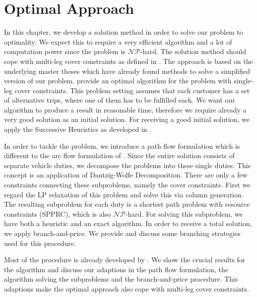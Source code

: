 \chapter{Optimal Approach}
\label{ch:optimal_approach}

In this chapter, we develop a solution method in order to solve our problem to optimality. We expect this to require a very efficient algorithm and a lot of computation power since the problem is $\mathcal{NP}$-hard. The solution method should cope with multi-leg cover constraints as defined in . The approach is based on the underlying master theses which have already found methods to solve a simplified version of our problem. \cite{Kaiser} provide an optimal algorithm for the problem with single-leg cover constraints. This problem setting assumes that each customer has a set of alternative trips, where one of them has to be fulfilled each. We want our algorithm to produce a result in reasonable time, therefore we require already a very good solution as an initial solution. For receiving a good initial solution, we apply the Successive Heuristics as developed in .

In order to tackle the problem, we introduce a path flow formulation which is different to the arc flow formulation of . Since the entire solution consists of separate vehicle duties, we decompose the problems into these single duties. This concept is an application of Dantzig-Wolfe Decomposition. There are only a few constraints connecting these subproblems, namely the cover constraints. First we regard the LP relaxation of this problem and solve this via column generation. The resulting subproblem for each duty is a shortest path problem with resource constraints (SPPRC), which is also $\mathcal{NP}$-hard. For solving this subproblem, we have both a heuristic and an exact algorithm. In order to receive a total solution, we apply branch-and-price. We provide and discuss some branching strategies used for this procedure.

Most of the procedure is already developed by \cite{Kaiser}. We show the crucial results for the algorithm and discuss our adaptions in the path flow formulation, the algorithm solving the subproblems and the branch-and-price procedure. This adaptions make the optimal approach also cope with multi-leg cover constraints.


